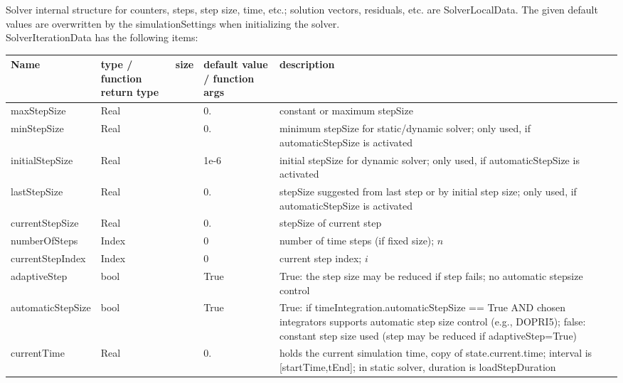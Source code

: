 \label{sec:SolverIterationData}
Solver internal structure for counters, steps, step size, time, etc.; solution vectors, residuals, etc. are SolverLocalData. The given default values are overwritten by the simulationSettings when initializing the solver.\\ 
%
SolverIterationData has the following items:
\begin{center}
  \footnotesize
  \begin{longtable}{| p{4.2cm} | p{2.5cm} | p{0.3cm} | p{3.0cm} | p{6cm} |}
    \hline
    \bf Name & \bf type / function return type & \bf size & \bf default value / function args & \bf description \\ \hline
    maxStepSize &     Real &      &     0. &     constant or maximum stepSize\\ \hline
    minStepSize &     Real &      &     0. &     minimum stepSize for static/dynamic solver; only used, if automaticStepSize is activated\\ \hline
    initialStepSize &     Real &      &     1e-6 &     initial stepSize for dynamic solver; only used, if automaticStepSize is activated\\ \hline
    lastStepSize &     Real &      &     0. &     stepSize suggested from last step or by initial step size; only used, if automaticStepSize is activated\\ \hline
    currentStepSize &     Real &      &     0. &     stepSize of current step\\ \hline
    numberOfSteps &     Index &      &     0 &     number of time steps (if fixed size); $n$\\ \hline
    currentStepIndex &     Index &      &     0 &     current step index; $i$\\ \hline
    adaptiveStep &     bool &      &     True &     True: the step size may be reduced if step fails; no automatic stepsize control\\ \hline
    automaticStepSize &     bool &      &     True &     True: if timeIntegration.automaticStepSize == True AND chosen integrators supports automatic step size control (e.g., DOPRI5); false: constant step size used (step may be reduced if adaptiveStep=True)\\ \hline
    currentTime &     Real &      &     0. &     holds the current simulation time, copy of state.current.time; interval is [startTime,tEnd]; in static solver, duration is loadStepDuration\\ \hline

\end{longtable}
\end{center}
